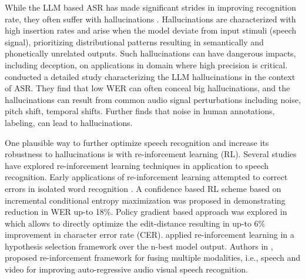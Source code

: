 \documentclass[conference]{IEEEtran}
\begin{document}
While the LLM based ASR has made significant strides in improving recognition rate, they often suffer with hallucinations \cite{atwany2025lost, frieske2024hallucinations}.
Hallucinations are characterized with high insertion rates and arise when the model deviate from input stimuli (speech signal), prioritizing distributional patterns resulting in semantically and phonetically unrelated outputs.
Such hallucinations can have dangerous impacts, including deception, on applications in domain where high precision is critical.
\cite{atwany2025lost} conducted a detailed study characterizing the LLM hallucinations in the context of ASR.
They find that low WER can often conceal big hallucinations, and the hallucinations can result from common audio signal perturbations including noise, pitch shift, temporal shifts.
Further \cite{frieske2024hallucinations} finds that noise in human annotations, labeling, can lead to hallucinations.

One plausible way to further optimize speech recognition and increase its robustness to hallucinations is with re-inforcement learning (RL).
Several studies have explored re-inforcement learning techniques in application to speech recognition.
Early applications of re-inforcement learning attempted to correct errors in isolated word recognition \cite{lee1990corrective}.
A confidence based RL scheme based on incremental conditional entropy maximization was proposed in \cite{molina2009maximum} demonstrating reduction in WER up-to 18\%.
Policy gradient based approach was explored in \cite{tjandra2019end} which allows to directly optimize the edit-distance resulting in up-to 6\% improvement in character error rate (CER).
\cite{kala2018reinforcement} applied re-inforcement learning in a hypothesis selection framework over the n-best model output.
Authors in \cite{chen2023leveraging}, proposed re-inforcement framework for fusing multiple modalities, i.e., speech and video for improving auto-regressive audio visual speech recognition.
\end{document}
